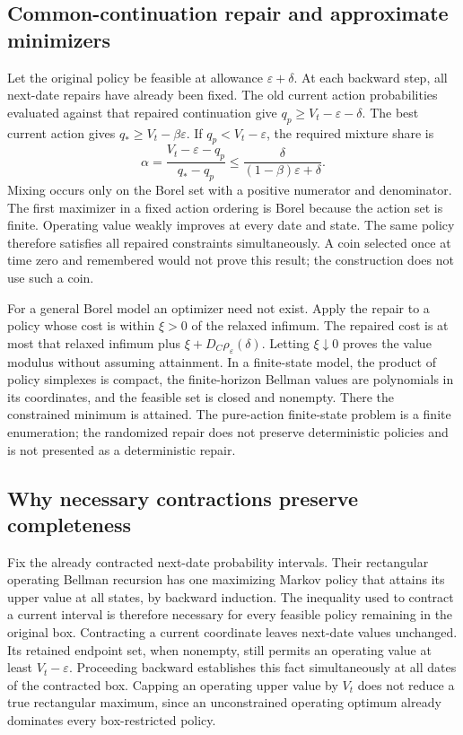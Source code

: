 \subsection{Common-continuation repair and approximate minimizers}
Let the original policy be feasible at allowance $\varepsilon+\delta$. At each backward step, all next-date repairs have already been fixed. The old current action probabilities evaluated against that repaired continuation give $q_p\geq V_t-\varepsilon-\delta$. The best current action gives $q_*\geq V_t-\beta\varepsilon$. If $q_p<V_t-\varepsilon$, the required mixture share is
\[
 \alpha=\frac{V_t-\varepsilon-q_p}{q_*-q_p}
 \leq\frac{\delta}{(1-\beta)\varepsilon+\delta}.
\]
Mixing occurs only on the Borel set with a positive numerator and denominator. The first maximizer in a fixed action ordering is Borel because the action set is finite. Operating value weakly improves at every date and state. The same policy therefore satisfies all repaired constraints simultaneously. A coin selected once at time zero and remembered would not prove this result; the construction does not use such a coin.

For a general Borel model an optimizer need not exist. Apply the repair to a policy whose cost is within $\xi>0$ of the relaxed infimum. The repaired cost is at most that relaxed infimum plus $\xi+D_C\rho_\varepsilon(\delta)$. Letting $\xi\downarrow0$ proves the value modulus without assuming attainment. In a finite-state model, the product of policy simplexes is compact, the finite-horizon Bellman values are polynomials in its coordinates, and the feasible set is closed and nonempty. There the constrained minimum is attained. The pure-action finite-state problem is a finite enumeration; the randomized repair does not preserve deterministic policies and is not presented as a deterministic repair.

\subsection{Why necessary contractions preserve completeness}
Fix the already contracted next-date probability intervals. Their rectangular operating Bellman recursion has one maximizing Markov policy that attains its upper value at all states, by backward induction. The inequality used to contract a current interval is therefore necessary for every feasible policy remaining in the original box. Contracting a current coordinate leaves next-date values unchanged. Its retained endpoint set, when nonempty, still permits an operating value at least $V_t-\varepsilon$. Proceeding backward establishes this fact simultaneously at all dates of the contracted box. Capping an operating upper value by $V_t$ does not reduce a true rectangular maximum, since an unconstrained operating optimum already dominates every box-restricted policy.

